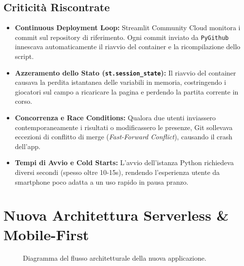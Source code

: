 \documentclass[11pt,a4paper]{article}
\begin{document}
\subsection{Criticit\`a Riscontrate}
\begin{itemize}
    \item \textbf{Continuous Deployment Loop:} Streamlit Community Cloud monitora i commit sul repository di riferimento. Ogni commit inviato da \texttt{PyGithub} innescava automaticamente il riavvio del container e la ricompilazione dello script.
    \item \textbf{Azzeramento dello Stato (\texttt{st.session\_state}):} Il riavvio del container causava la perdita istantanea delle variabili in memoria, costringendo i giocatori sul campo a ricaricare la pagina e perdendo la partita corrente in corso.
    \item \textbf{Concorrenza e Race Conditions:} Qualora due utenti inviassero contemporaneamente i risultati o modificassero le presenze, Git sollevava eccezioni di conflitto di merge (\textit{Fast-Forward Conflict}), causando il crash dell'app.
    \item \textbf{Tempi di Avvio e Cold Starts:} L'avvio dell'istanza Python richiedeva diversi secondi (spesso oltre 10-15s), rendendo l'esperienza utente da smartphone poco adatta a un uso rapido in pausa pranzo.
\end{itemize}

\section{Nuova Architettura Serverless \& Mobile-First}

\begin{figure}[htbp]
\centering
{}
\caption{Diagramma del flusso architetturale della nuova applicazione.}
\label{fig:arch}
\end{figure}
\end{document}

